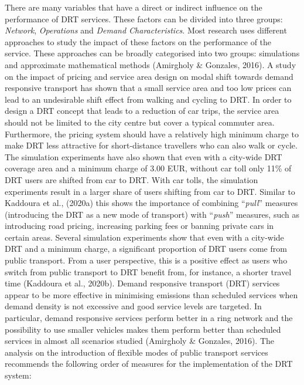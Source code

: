 \documentclass[
]{book}
\begin{document}
There are many variables that have a direct or indirect influence on the performance of DRT services. These factors can be divided into three groups: \emph{Network}, \emph{Operations} and \emph{Demand Characteristics}. Most research uses different approaches to study the impact of these factors on the performance of the service. These approaches can be broadly categorised into two groups: simulations and approximate mathematical methods (Amirgholy \& Gonzales, 2016).
A study on the impact of pricing and service area design on modal shift towards demand responsive transport has shown that a small service area and too low prices can lead to an undesirable shift effect from walking and cycling to DRT. In order to design a DRT concept that leads to a reduction of car trips, the service area should not be limited to the city centre but cover a typical commuter area. Furthermore, the pricing system should have a relatively high minimum charge to make DRT less attractive for short-distance travellers who can also walk or cycle. The simulation experiments have also shown that even with a city-wide DRT coverage area and a minimum charge of 3.00 EUR, without car toll only 11\% of DRT users are shifted from car to DRT. With car tolls, the simulation experiments result in a larger share of users shifting from car to DRT. Similar to Kaddoura et al., (2020a) this shows the importance of combining ``\emph{pull}'' measures (introducing the DRT as a new mode of transport) with ``\emph{push}'' measures, such as introducing road pricing, increasing parking fees or banning private cars in certain areas. Several simulation experiments show that even with a city-wide DRT and a minimum charge, a significant proportion of DRT users come from public transport. From a user perspective, this is a positive effect as users who switch from public transport to DRT benefit from, for instance, a shorter travel time (Kaddoura et al., 2020b).
Demand responsive transport (DRT) services appear to be more effective in minimising emissions than scheduled services when demand density is not excessive and good service levels are targeted. In particular, demand responsive services perform better in a ring network and the possibility to use smaller vehicles makes them perform better than scheduled services in almost all scenarios studied (Amirgholy \& Gonzales, 2016).
The analysis on the introduction of flexible modes of public transport services recommends the following order of measures for the implementation of the DRT system:
\end{document}
